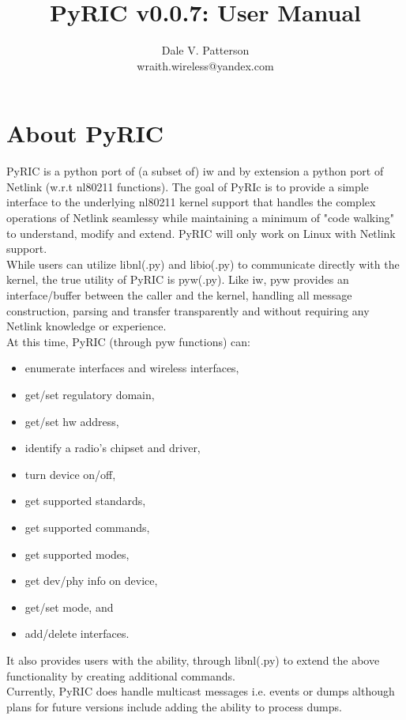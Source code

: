 \documentclass[11pt]{article}
\title{PyRIC v0.0.7: User Manual}
\author{Dale V. Patterson\\ wraith.wireless@yandex.com}
\begin{document}
\maketitle
\tableofcontents

\section{About PyRIC}\label{sec:About}
PyRIC is a python port of (a subset of) iw and by extension a python port of 
Netlink\cite{spae} (w.r.t nl80211 functions). The goal of PyRIc is to provide 
a simple interface to the underlying nl80211 kernel support that handles the 
complex operations of Netlink seamlessy while maintaining a minimum of "code 
walking" to understand, modify and extend. PyRIC will only work on Linux 
with Netlink support.\\

While users can utilize libnl(.py) and libio(.py) to communicate directly with 
the kernel, the true utility of PyRIC is pyw(.py). Like iw, pyw provides an 
interface/buffer between the caller and the kernel, handling all message
construction, parsing and transfer transparently and without requiring any 
Netlink knowledge or experience. \\

At this time, PyRIC (through pyw functions) can:
\begin{itemize}
\item enumerate interfaces and wireless interfaces,
\item get/set regulatory domain,
\item get/set hw address,
\item identify a radio's chipset and driver,
\item turn device on/off,
\item get supported standards,
\item get supported commands,
\item get supported modes,
\item get dev/phy info on device,
\item get/set mode, and
\item add/delete interfaces. 
\end{itemize}
It also provides users with the ability, through libnl(.py) to extend the above 
functionality by creating additional commands.\\

Currently, PyRIC does handle multicast messages i.e. events or dumps although 
plans for future versions include adding the ability to process dumps.
\end{document}
